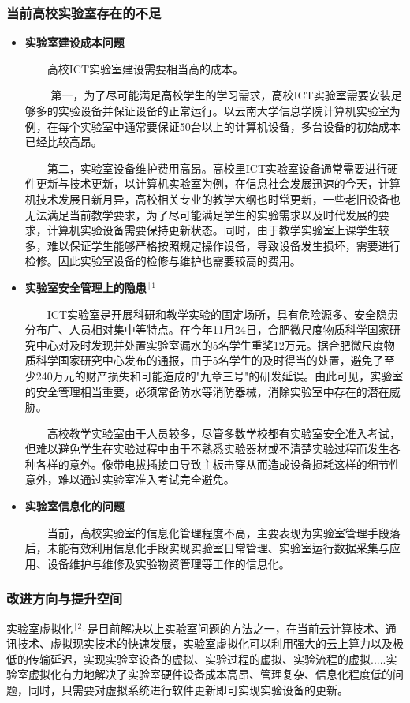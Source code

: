 \documentclass{imutthesis}
\begin{document}
\subsubsection{当前高校实验室存在的不足}
\begin{itemize}
    \item \textbf{实验室建设成本问题}
    
    $\qquad$高校ICT实验室建设需要相当高的成本。

    $\qquad$ 第一，为了尽可能满足高校学生的学习需求，高校ICT实验室需要安装足够多的实验设备并保证设备的正常运行。以云南大学信息学院计算机实验室为例，在每个实验室中通常要保证50台以上的计算机设备，多台设备的初始成本已经比较高昂。

    $\qquad$第二，实验室设备维护费用高昂。高校里ICT实验室设备通常需要进行硬件更新与技术更新，以计算机实验室为例，在信息社会发展迅速的今天，计算机技术发展日新月异，高校相关专业的教学大纲也时常更新，一些老旧设备也无法满足当前教学要求，为了尽可能满足学生的实验需求以及时代发展的要求，计算机实验设备需要保持更新状态。同时，由于教学实验室上课学生较多，难以保证学生能够严格按照规定操作设备，导致设备发生损坏，需要进行检修。因此实验室设备的检修与维护也需要较高的费用。
    
    \item \textbf{实验室安全管理上的隐患$^{[1]}$}
    
    $\qquad$ICT实验室是开展科研和教学实验的固定场所，具有危险源多、安全隐患分布广、人员相对集中等特点。在今年11月24日，合肥微尺度物质科学国家研究中心对及时发现并处置实验室漏水的5名学生重奖12万元。据合肥微尺度物质科学国家研究中心发布的通报，由于5名学生的及时得当的处置，避免了至少240万元的财产损失和可能造成的"九章三号"的研发延误。由此可见，实验室的安全管理相当重要，必须常备防水等消防器械，消除实验室中存在的潜在威胁。

    $\qquad$高校教学实验室由于人员较多，尽管多数学校都有实验室安全准入考试，但难以避免学生在实验过程中由于不熟悉实验器材或不清楚实验过程而发生各种各样的意外。像带电拔插接口导致主板击穿从而造成设备损耗这样的细节性意外，难以通过实验室准入考试完全避免。

    \item \textbf{实验室信息化的问题}
    
    $\qquad$当前，高校实验室的信息化管理程度不高，主要表现为实验室管理手段落后，未能有效利用信息化手段实现实验室日常管理、实验室运行数据采集与应用、设备维护与维修及实验物资管理等工作的信息化。

\end{itemize}
\subsubsection{改进方向与提升空间}
实验室虚拟化$^{[2]}$是目前解决以上实验室问题的方法之一，在当前云计算技术、通讯技术、虚拟现实技术的快速发展，实验室虚拟化可以利用强大的云上算力以及极低的传输延迟，实现实验室设备的虚拟、实验过程的虚拟、实验流程的虚拟.....实验室虚拟化有力地解决了实验室硬件设备成本高昂、管理复杂、信息化程度低的问题，同时，只需要对虚拟系统进行软件更新即可实现实验设备的更新。
\end{document}
